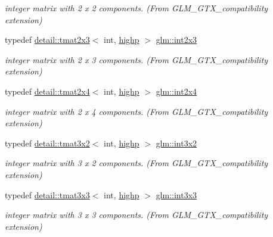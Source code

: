 \begin{DoxyCompactItemize}
\begin{DoxyCompactList}\small\item\em integer matrix with 2 x 2 components. (From G\+L\+M\+\_\+\+G\+T\+X\+\_\+compatibility extension) \end{DoxyCompactList}\item 
typedef \hyperlink{structglm_1_1detail_1_1tmat2x3}{detail\+::tmat2x3}$<$ int, \hyperlink{namespaceglm_a0f04f086094c747d227af4425893f545ac6f7eab42eacbb10d59a58e95e362074}{highp} $>$ \hyperlink{group__gtx__compatibility_ga42c3d6e4924de559104b9ca2b127c9ac}{glm\+::int2x3}
\begin{DoxyCompactList}\small\item\em integer matrix with 2 x 3 components. (From G\+L\+M\+\_\+\+G\+T\+X\+\_\+compatibility extension) \end{DoxyCompactList}\item 
typedef \hyperlink{structglm_1_1detail_1_1tmat2x4}{detail\+::tmat2x4}$<$ int, \hyperlink{namespaceglm_a0f04f086094c747d227af4425893f545ac6f7eab42eacbb10d59a58e95e362074}{highp} $>$ \hyperlink{group__gtx__compatibility_ga145a388c0d988490d6ce901a664faf50}{glm\+::int2x4}
\begin{DoxyCompactList}\small\item\em integer matrix with 2 x 4 components. (From G\+L\+M\+\_\+\+G\+T\+X\+\_\+compatibility extension) \end{DoxyCompactList}\item 
typedef \hyperlink{structglm_1_1detail_1_1tmat3x2}{detail\+::tmat3x2}$<$ int, \hyperlink{namespaceglm_a0f04f086094c747d227af4425893f545ac6f7eab42eacbb10d59a58e95e362074}{highp} $>$ \hyperlink{group__gtx__compatibility_ga2b1f3046fb4692c0c2f76b3933389868}{glm\+::int3x2}
\begin{DoxyCompactList}\small\item\em integer matrix with 3 x 2 components. (From G\+L\+M\+\_\+\+G\+T\+X\+\_\+compatibility extension) \end{DoxyCompactList}\item 
typedef \hyperlink{structglm_1_1detail_1_1tmat3x3}{detail\+::tmat3x3}$<$ int, \hyperlink{namespaceglm_a0f04f086094c747d227af4425893f545ac6f7eab42eacbb10d59a58e95e362074}{highp} $>$ \hyperlink{group__gtx__compatibility_ga8773c9f240dcac9f28d1afef71f7f779}{glm\+::int3x3}
\begin{DoxyCompactList}\small\item\em integer matrix with 3 x 3 components. (From G\+L\+M\+\_\+\+G\+T\+X\+\_\+compatibility extension) \end{DoxyCompactList}\item 

\end{DoxyCompactItemize}
